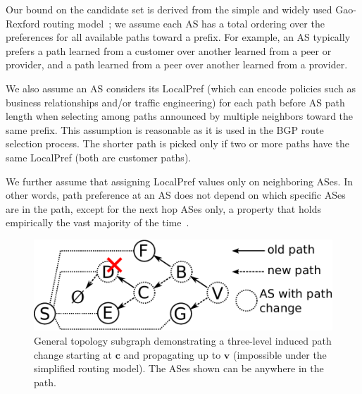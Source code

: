 
Our bound on the candidate set is derived from the simple and widely
used Gao-Rexford routing model~\cite{gao}; \ie we assume each AS
has a total ordering over the preferences for all available paths toward a
prefix. For example, an AS typically prefers a path learned from a
customer over another learned from a peer or provider, and a path
learned from a peer over another learned from a provider.

We also assume an AS considers its LocalPref (which can encode policies
such as business relationships and/or traffic engineering) for each
path before AS path length when selecting among paths
announced by multiple neighbors toward the same prefix.  This assumption
is reasonable as it is used in the BGP route selection process.
The shorter path is picked only if two or more paths have the same
LocalPref (\eg both are customer paths).

We further assume that assigning LocalPref values
only on neighboring ASes. In other words, path preference at an AS 
does not depend on which specific ASes are in the path, except for the next hop ASes only, 
a property that holds empirically the vast majority of the time~\cite{gill:nanog}.

\begin{figure}[t]
\centering\includegraphics[width=\columnwidth]{figs/induced3b.pdf}
\vspace{-5mm}
%
\caption{General topology subgraph demonstrating a three-level induced
path change starting at $\boldsymbol{c}$ and propagating up to
$\boldsymbol{v}$ (impossible under the simplified routing model).  The
ASes shown can be anywhere in the path.}
%
\label{fig:induced3}
\end{figure}

